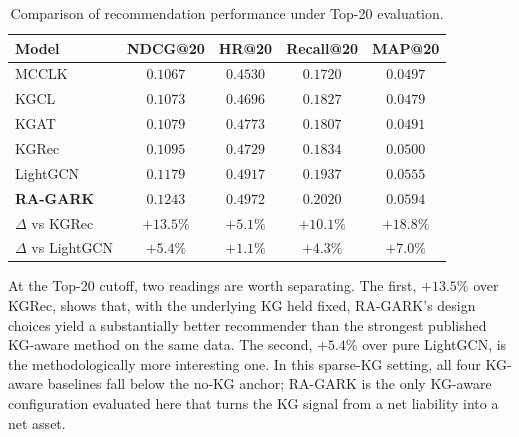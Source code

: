 \begin{table}[H]
\centering
\caption{Comparison of recommendation performance under Top-20 evaluation.}
\label{tab:main}
\begin{tabular}{lcccc}
\toprule
Model & NDCG@20 & HR@20 & Recall@20 & MAP@20 \\
\midrule
MCCLK~\cite{zou2022mcclk}   & $0.1067$ & $0.4530$ & $0.1720$ & $0.0497$ \\
KGCL~\cite{yang2022kgcl}    & $0.1073$ & $0.4696$ & $0.1827$ & $0.0479$ \\
KGAT~\cite{wang2019kgat}    & $0.1079$ & $0.4773$ & $0.1807$ & $0.0491$ \\
KGRec~\cite{yang2023kgrec}  & $0.1095$ & $0.4729$ & $0.1834$ & $0.0500$ \\
LightGCN~\cite{he2020lightgcn} & $0.1179$ & $0.4917$ & $0.1937$ & $0.0555$ \\
\midrule
\textbf{RA-GARK}     & $\mathbf{0.1243}$ & $\mathbf{0.4972}$ & $\mathbf{0.2020}$ & $\mathbf{0.0594}$ \\
\midrule
$\Delta$ vs KGRec            & $+13.5\%$ & $+5.1\%$  & $+10.1\%$ & $+18.8\%$ \\
$\Delta$ vs LightGCN         & $+5.4\%$  & $+1.1\%$  & $+4.3\%$  & $+7.0\%$  \\
\bottomrule
\end{tabular}
\end{table}

At the Top-20 cutoff, two readings are worth separating. The first, $+13.5\%$ over KGRec, shows that, with the underlying KG held fixed, RA-GARK's design choices yield a substantially better recommender than the strongest published KG-aware method on the same data. The second, $+5.4\%$ over pure LightGCN, is the methodologically more interesting one. In this sparse-KG setting, all four KG-aware baselines fall below the no-KG anchor; RA-GARK is the only KG-aware configuration evaluated here that turns the KG signal from a net liability into a net asset.

